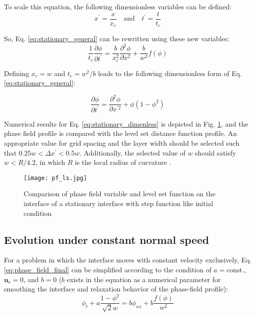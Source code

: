 To scale this equation, the following dimensionless variables can be defined:
\begin{equation} \label{eq:dimenless_variables}
x^\prime = \frac{x}{x_c} \quad \text{and} \quad t^\prime = \frac{t}{t_c}
\end{equation}

So, Eq. \ref{eq:stationary_general} can be rewritten using these new variables:
\begin{equation} 
\frac{1}{t_{c}} \frac{\partial \phi}{\partial t^{\prime}}=\frac{b}{x_{c}^{2}} \frac{\partial^{2} \phi}{\partial x^{2}}+\frac{b}{w^{2}} f(\phi)
\end{equation}

Defining $x_c = w$ and $t_c=w^2/b$ leads to the following dimensionless form of Eq. \ref{eq:stationary_general}:

\begin{equation} \label{eq:stationary_dimenless}
\frac{\partial \phi}{\partial t^{\prime}}=\frac{\partial^{2} \phi}{\partial x^{\prime 2}}+\phi\left(1-\phi^{2}\right)
\end{equation}

Numerical results for Eq. \ref{eq:stationary_dimenless} is depicted in Fig.  \ref{fig:fig:pf_ls}, and the phase field profile is compared with the level set distance function profile. An appropriate value for grid spacing and the layer width should be selected such that $0.25 w < \Delta x^\prime < 0.5 w $. Additionally, the selected value of $w$ should satisfy $w < R/4.2$, in which $R$ is the local radius of curvature \cite{Sun2007}.

\begin{figure}
\medskip
\centering
\texttt{[image: pf\_ls.jpg]}
\caption[Comparison of phase field variable and level set function]{Comparison of phase field variable and level set function on the interface of a stationary interface with step function like initial condition \cite{Sun2007}}
\label{fig:fig:pf_ls}
\end{figure}


\subsection{Evolution under constant normal speed}

For a problem in which the interface moves with constant velocity exclusively, Eq. \ref{eq:phase_field_final} can be simplified according to the condition of $a=\text{const.}$, $\boldsymbol{u}_{\mathrm{e}}=0$, and $b=0$ ($b$ exists in the equation as a numerical parameter for smoothing the interface and relaxation behavior of the phase-field profile):
\begin{equation}
\phi_{t}+a \frac{1-\phi^{2}}{\sqrt{2} w}=b \phi_{xx} + b\frac{f(\phi)}{w^{2}}
\end{equation}

